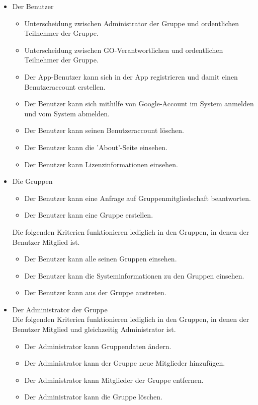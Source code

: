 \documentclass[parskip=full]{scrartcl}
\begin{document}
\begin{itemize}[itemsep=0pt]
	\item Der Benutzer  
	\begin{itemize}
		\item Unterscheidung zwischen Administrator der Gruppe und ordentlichen Teilnehmer der Gruppe.
		\item Unterscheidung zwischen GO-Verantwortlichen und ordentlichen Teilnehmer der Gruppe.
	 	\item Der App-Benutzer kann sich in der App registrieren und damit einen Benutzeraccount erstellen.
	 	\item Der Benutzer kann sich mithilfe von Google-Account im \gls{System} anmelden und vom System abmelden.
	 	\item Der Benutzer kann seinen Benutzeraccount löschen.
	 	\item Der Benutzer kann die 'About'-Seite einsehen.
	 	\item Der Benutzer kann Lizenzinformationen einsehen.
	\end{itemize} 
	
	\item Die Gruppen
	\begin{itemize}
	 	\item Der Benutzer kann eine Anfrage auf Gruppenmitgliedschaft beantworten.
	 	\item Der Benutzer kann eine Gruppe erstellen.
	 \end{itemize}
	 Die folgenden Kriterien funktionieren lediglich in den Gruppen, in denen der Benutzer Mitglied ist.
	 \begin{itemize}
	 	\item Der Benutzer kann alle seinen Gruppen einsehen.
	 	\item Der Benutzer kann die Systeminformationen zu den Gruppen einsehen.
	 	\item Der Benutzer kann aus der Gruppe austreten.
	\end{itemize}
	
	\item Der Administrator der Gruppe\\
	Die folgenden Kriterien funktionieren lediglich in den Gruppen, in denen der Benutzer Mitglied und gleichzeitig Administrator ist.
	\begin{itemize}
		\item Der Administrator kann Gruppendaten ändern.
		\item Der Administrator kann der Gruppe neue Mitglieder hinzufügen.
		\item Der Administrator kann Mitglieder der Gruppe entfernen.
		\item Der Administrator kann die Gruppe löschen.  
	\end{itemize}
	

\end{itemize}
\end{document}
